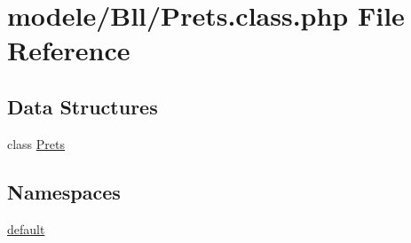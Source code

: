 \hypertarget{_prets_8class_8php}{}\section{modele/\+Bll/\+Prets.class.\+php File Reference}
\label{_prets_8class_8php}
\subsection*{Data Structures}
\begin{DoxyCompactItemize}
\item 
class \hyperlink{class_prets}{Prets}
\end{DoxyCompactItemize}
\subsection*{Namespaces}
\begin{DoxyCompactItemize}
\item 
 \hyperlink{namespacedefault}{default}
\end{DoxyCompactItemize}
